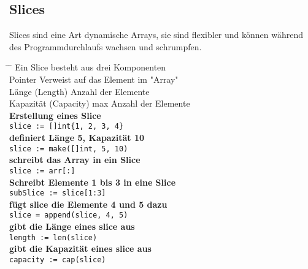 \documentclass[twoside,a4paper,12pt]{article}
\begin{document}
\subsection{Slices}
Slices sind eine Art dynamische Arrays, sie sind flexibler und können während \\ 
des Programmdurchlaufs wachsen und schrumpfen.  
\begin{tabbing}
 \hspace{2mm} \= \hspace{50mm} \= \kill
 \> Ein Slice besteht aus drei Komponenten \\ 
 \> Pointer \> Verweist auf das Element im "Array" \\ 
 \> Länge (Length) \> Anzahl der Elemente \\ 
 \> Kapazität (Capacity) \> max Anzahl der Elemente \\ 
 \> \textbf{Erstellung eines Slice} \\
 \> \verb|slice := []int{1, 2, 3, 4}| \\ 
 \> \textbf{definiert Länge 5, Kapazität 10} \\ 
 \> \verb|slice := make([]int, 5, 10)| \\ 
 \> \textbf{schreibt das Array in ein Slice} \\
 \> \verb|slice := arr[:]| \\ 
 \> \textbf{Schreibt Elemente 1 bis 3 in eine Slice} \\ 
 \> \verb|subSlice := slice[1:3]| \\ 
 \> \textbf{fügt slice die Elemente 4 und 5 dazu} \\ 
 \> \verb|slice = append(slice, 4, 5)| \\  
 \> \textbf{gibt die Länge eines slice aus} \\ 
 \> \verb|length := len(slice)| \\ 
 \> \textbf{gibt die Kapazität eines slice aus} \\ 
 \> \verb|capacity := cap(slice)| \\
\end{tabbing}
\end{document}
